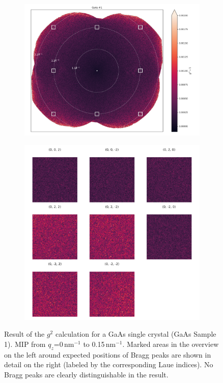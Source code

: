  
\begin{figure}
	\centering
	\begin{subfigure}[b]{0.55\textwidth}
		\includegraphics[width=\linewidth]{images/gaas1_overview.pdf}
	\end{subfigure}
	\begin{subfigure}[b]{0.4\textwidth}
		\includegraphics[width=\linewidth]{images/gaas1_zoom.pdf}
	\end{subfigure}
	\caption[Results GaAs]{Result of the $g^2$ calculation for a GaAs single crystal (GaAs Sample 1). MIP from $q_z$=0\,nm$^{-1}$ to 0.15\,nm$^{-1}$. Marked areas in the overview on the left around expected positions of Bragg peaks are shown in detail on the right (labeled by the corresponding Laue indices). No Bragg peaks are  clearly distinguishable in the result.}
	\label{fig:resgaas1}
\end{figure}



